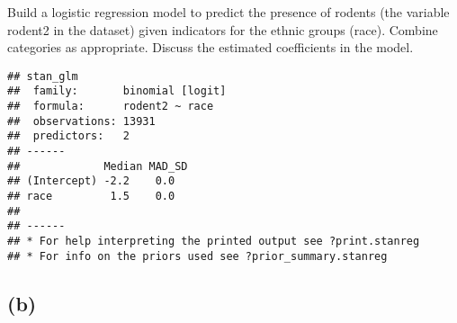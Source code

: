 \documentclass[
]{article}
\newenvironment{Shaded}{\begin{snugshade}}{\end{snugshade}}
\newcommand{\CommentTok}[1]{\textcolor[rgb]{0.56,0.35,0.01}{\textit{#1}}}
\newcommand{\ControlFlowTok}[1]{\textcolor[rgb]{0.13,0.29,0.53}{\textbf{#1}}}
\newcommand{\DataTypeTok}[1]{\textcolor[rgb]{0.13,0.29,0.53}{#1}}
\newcommand{\DecValTok}[1]{\textcolor[rgb]{0.00,0.00,0.81}{#1}}
\newcommand{\KeywordTok}[1]{\textcolor[rgb]{0.13,0.29,0.53}{\textbf{#1}}}
\newcommand{\NormalTok}[1]{#1}
\newcommand{\OperatorTok}[1]{\textcolor[rgb]{0.81,0.36,0.00}{\textbf{#1}}}
\newcommand{\StringTok}[1]{\textcolor[rgb]{0.31,0.60,0.02}{#1}}
\begin{document}
Build a logistic regression model to predict the presence of rodents
(the variable rodent2 in the dataset) given indicators for the ethnic
groups (race). Combine categories as appropriate. Discuss the estimated
coefficients in the model.

\begin{Shaded}
\end{Shaded}

\begin{verbatim}
## stan_glm
##  family:       binomial [logit]
##  formula:      rodent2 ~ race
##  observations: 13931
##  predictors:   2
## ------
##             Median MAD_SD
## (Intercept) -2.2    0.0  
## race         1.5    0.0  
## 
## ------
## * For help interpreting the printed output see ?print.stanreg
## * For info on the priors used see ?prior_summary.stanreg
\end{verbatim}

\hypertarget{b-3}{%
\subsection{(b)}\label{b-3}}
\end{document}
